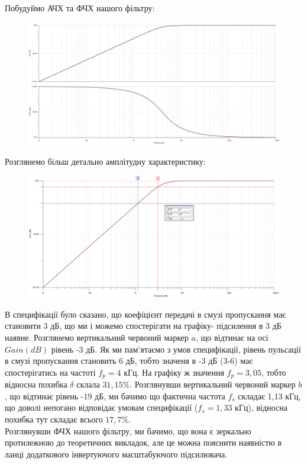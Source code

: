 \documentclass[14pt,a4paper]{scrartcl}
\begin{document}
Побудуймо АЧХ та ФЧХ нашого фільтру:
\begin{figure}[!h]\TopFloatBoxes\CenterFloatBoxes
{}%
           {\includegraphics[width=\textwidth]{req}}
\end{figure}
\newpage
Розглянемо більш детально амплітудну характеристику:
\begin{figure}[!h]\TopFloatBoxes\CenterFloatBoxes
{}%
           {\includegraphics[width=\textwidth]{amplitude}}
\end{figure}

В специфікації було сказано, що коефіцієнт передачі в смузі пропускання має становити 3 дБ, що ми і можемо спостерігати на графіку- підсилення в 3 дБ наявне. Розглянемо вертикальний червоний маркер $a$, що відтинає на осі $Gain (dB)$ рівень -3 дБ. Як ми пам'ятаємо з умов специфікації, рівень пульсації в смузі пропускання становить 6 дБ, тобто значеня в -3 дБ (3-6) має спостерігатись на частоті $f_p=4$ кГц. На графіку ж значення $f_p=3,05$, тобто відносна похибка $\delta$ склала $31,15\%$. Розглянувши вертикальний червоний маркер $b$, що відтинає рівень -19 дБ, ми бачимо що фактична частота $f_s$ складає 1,13 кГц, що доволі непогано відповідає умовам специфікації ($f_s=1,33$ кГц), відносна похибка тут складає всього $17,7\%$.\\

Розглянувши ФЧХ нашого фільтру, ми бачимо, що вона є зеркально протилежною до теоретичних викладок, але це можна пояснити наявністю в ланці додаткового інвертуючого масштабуючого підсилювача.  






\end{document}
